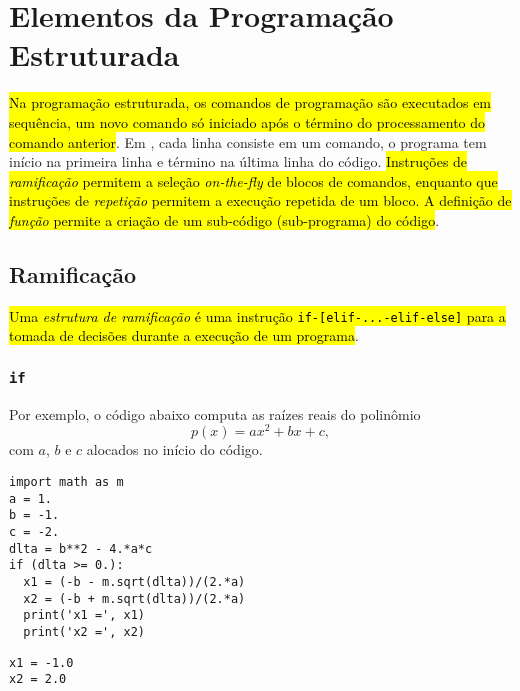
\section{Elementos da Programação Estruturada}\label{sec_progest}

\hl{Na programação estruturada, os comandos de programação são executados em sequência, um novo comando só iniciado após o término do processamento do comando anterior}. Em {\python}, cada linha consiste em um comando, o programa tem início na primeira linha e término na última linha do código. \hl{Instruções de \emph{ramificação} permitem a seleção \textit{on-the-fly} de blocos de comandos, enquanto que instruções de \emph{repetição} permitem a execução repetida de um bloco. A definição de \emph{função} permite a criação de um sub-código (sub-programa) do código}.

\subsection{Ramificação}

\hl{Uma \emph{estrutura de ramificação} é uma instrução \texttt{if-[elif-...-elif-else]} para a tomada de decisões durante a execução de um programa}.

\subsubsection{\texttt{if}}

Por exemplo, o código abaixo computa as raízes reais do polinômio
\begin{equation}
  p(x) = ax^2 + bx + c,
\end{equation}  
com $a$, $b$ e $c$ alocados no início do código.

\begin{lstlisting}
import math as m
a = 1.
b = -1.
c = -2.
dlta = b**2 - 4.*a*c
if (dlta >= 0.):
  x1 = (-b - m.sqrt(dlta))/(2.*a)
  x2 = (-b + m.sqrt(dlta))/(2.*a)
  print('x1 =', x1)
  print('x2 =', x2)
\end{lstlisting}

\begin{verbatim}
x1 = -1.0
x2 = 2.0
\end{verbatim}

